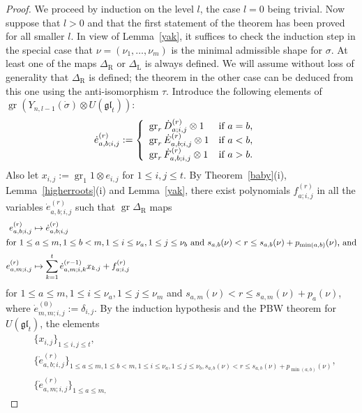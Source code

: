 \documentclass[twoside,12pt,reqno]{amsart}
\def\rt{{\operatorname{\scriptscriptstyle R}}}
\def\lt{{\operatorname{\scriptscriptstyle L}}}
\def\gr{\operatorname{gr}}
\begin{document}
\begin{proof}
We proceed by induction on the level $l$,
the case $l = 0$ being trivial. Now suppose that $l > 0$
and that the first statement of the theorem has been proved for
all smaller $l$. In view of Lemma~\ref{yak}, it suffices to check
the induction step in the special case that $\nu = (\nu_1,\dots,\nu_m)$
is the minimal admissible shape for $\sigma$.
At least one of the maps $\Delta_{\rt}$ or $\Delta_{\lt}$
is always defined. We will assume without loss
of generality that $\Delta_{\rt}$ is defined; the theorem 
in the other case can be deduced from this one using the
anti-isomorphism $\tau$.
Introduce the following elements
of $\gr (Y_{n,l-1}(\dot \sigma) \otimes U(\mathfrak{gl}_t))$:
\begin{align*}
\dot e_{a,b;i,j}^{(r)} &:= 
\left\{
\begin{array}{ll}
\gr_r \dot D_{a;i,j}^{(r)} \otimes 1&\hbox{if $a = b$,}\\
\gr_r \dot E_{a,b;i,j}^{(r)} \otimes 1&\hbox{if $a < b$,}\\
\gr_r \dot F_{a,b;i,j}^{(r)} \otimes 1&\hbox{if $a > b$.}
\end{array}
\right.
\end{align*}
Also let
$x_{i,j} := \gr_1 1 \otimes e_{i,j}$ for $1 \leq i,j \leq t$.
By Theorem~\ref{baby}(i), Lemma~\ref{higherroots}(i) and Lemma~\ref{yak},
there exist polynomials
$f_{a;i,j}^{(r)}$ in all the variables
$\dot e_{a,b;i,j}^{(r)}$
such that $\gr \Delta_{\rt}$ maps
\begin{align}\label{first}
e_{a,b;i,j}^{(r)} &\mapsto \dot e_{a,b;i,j}^{(r)}\\\intertext{for 
$1 \leq a \leq m, 1 \leq b < m, 1 \leq i\leq \nu_a,
1 \leq j \leq \nu_b$ and $s_{a,b}(\nu) < r \leq s_{a,b}(\nu)+
p_{\min(a,b)}(\nu)$, and}
\label{second}
e_{a,m;i,j}^{(r)} &\mapsto \sum_{k=1}^t \dot e_{a,m;i,k}^{(r-1)}
x_{k,j} + f_{a;i,j}^{(r)}
\end{align}
for $1\leq a \leq m, 1 \leq i \leq \nu_a, 1\leq j \leq \nu_m$
and $s_{a,m}(\nu) < r \leq s_{a,m}(\nu)+p_a(\nu)$,
where $\dot e_{m,m;i,j}^{(0)} := \delta_{i,j}$.
By the induction hypothesis and the PBW theorem for $U(\mathfrak{gl}_t)$, 
the elements
\begin{align*}
&\{x_{i,j}\}_{1 \leq i,j \leq t},\\
&\{\dot e_{a,b;i,j}^{(r)}\}_{1 \leq a \leq m, 1 \leq b < m,
1 \leq i \leq \nu_a, 1 \leq j \leq \nu_b,
s_{a,b}(\nu) < r \leq s_{a,b}(\nu)+p_{\min(a,b)}(\nu)},\\
&\{\dot e_{a,m;i,j}^{(r)}\}_{1 \leq a \leq m,
}
\end{align*}
\end{proof}
\end{document}

